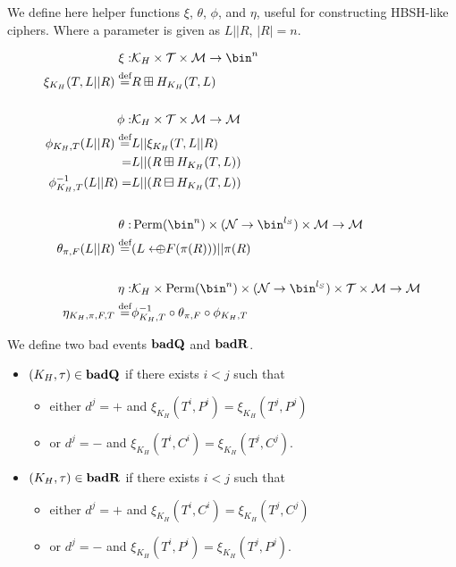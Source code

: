\documentclass[eprint.tex]{subfiles}
\begin{document}
We define here
helper functions $\xi$, $\theta$, $\phi$, and $\eta$, useful for constructing
HBSH-like ciphers. Where a parameter is given as
$L || R$, $|R|=n$.

\begin{align*}
    \xi :& \mathcal{K}_H \times \mathcal{T} \times \mathcal{M} \rightarrow \bin^n \\
    \xi_{K_H}(T, L||R) \defeq& R \boxplus H_{K_H}(T, L) \\
    \allowdisplaybreaks[4] \vphantom{|} \\ \allowdisplaybreaks[0]
    \phi :& \mathcal{K}_H \times \mathcal{T} \times \mathcal{M} \rightarrow \mathcal{M} \\
    \phi_{K_H, T}(L || R) \defeq& L || \xi_{K_H}(T, L||R) \\
    =& L || (R \boxplus H_{K_H}(T, L)) \\
    \phi^{-1}_{K_H, T}(L || R) =& L || (R \boxminus H_{K_H}(T, L)) \\
    \allowdisplaybreaks[4] \vphantom{|} \\ \allowdisplaybreaks[0]
    \theta :& \Perm(\bin^n) \times (\mathcal{N} \rightarrow \bin^{l_S}) \times \mathcal{M} \rightarrow \mathcal{M} \\
    \theta_{\pi, F}(L || R) \defeq& (L \arrowoplus F(\pi(R))) || \pi(R) \\
    \allowdisplaybreaks[4] \vphantom{|} \\ \allowdisplaybreaks[0]
    \eta :& \mathcal{K}_H \times \Perm(\bin^n) \times (\mathcal{N} \rightarrow \bin^{l_S}) \times \mathcal{T} \times \mathcal{M} \rightarrow \mathcal{M} \\
    \eta_{K_H, \pi, F, T} \defeq& \phi_{K_H,T}^{-1} \circ \theta_{\pi, F} \circ \phi_{K_H,T} \\
\end{align*}

We define two bad events $\operatorname{\mathbf{badQ}}$ and $\operatorname{\mathbf{badR}}$.

\begin{itemize}
    \item $(K_H, \tau) \in \operatorname{\mathbf{badQ}}$ if there exists $i < j$ such that
    \begin{itemize}
        \item either $d^j = +$ and $\xi_{K_H}(T^i, P^i) = \xi_{K_H}(T^j, P^j)$
        \item or $d^j = -$ and $\xi_{K_H}(T^i, C^i) = \xi_{K_H}(T^j, C^j)$.
    \end{itemize}
    \item $(K_H, \tau) \in \operatorname{\mathbf{badR}}$ if there exists $i < j$ such that
    \begin{itemize}
        \item either $d^j = +$ and $\xi_{K_H}(T^i, C^i) = \xi_{K_H}(T^j, C^j)$
        \item or $d^j = -$ and $\xi_{K_H}(T^i, P^i) = \xi_{K_H}(T^j, P^j)$.
    \end{itemize}
\end{itemize}
\end{document}
